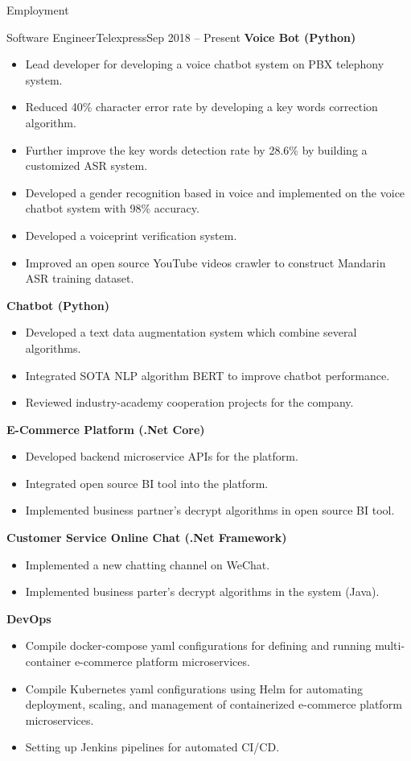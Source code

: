 \documentclass[]{mcdowellcv}
\begin{document}
	\makeheader
	
	\begin{cvsection}{Employment}
		\begin{cvsubsection}{Software Engineer}{Telexpress}{Sep 2018 -- Present}
			\textbf{Voice Bot (Python)}
			\begin{itemize}
				\item Lead developer for developing a voice chatbot system on PBX telephony system.
				\item Reduced 40\% character error rate by developing a key words correction algorithm.
				\item Further improve the key words detection rate by 28.6\% by building a customized ASR system.
				\item Developed a gender recognition based in voice and implemented on the voice chatbot system with 98\% accuracy.
				\item Developed a voiceprint verification system.
				\item Improved an open source YouTube videos crawler to construct Mandarin ASR training dataset.
			\end{itemize}
			\textbf{Chatbot (Python)}
			\begin{itemize}
				\item Developed a text data augmentation system which combine several algorithms.
				\item Integrated SOTA NLP algorithm BERT to improve chatbot performance.
				\item Reviewed industry-academy cooperation projects for the company.
			\end{itemize}
			\textbf{E-Commerce Platform (.Net Core)}
			\begin{itemize}
				\item Developed backend microservice APIs for the platform.
				\item Integrated open source BI tool into the platform.
				\item Implemented business partner's decrypt algorithms in open source BI tool.
			\end{itemize}
			\textbf{Customer Service Online Chat (.Net Framework)}
			\begin{itemize}
				\item Implemented a new chatting channel on WeChat.
				\item Implemented business parter's decrypt algorithms in the system (Java).
			\end{itemize}
			\textbf{DevOps}
			\begin{itemize}
				\item Compile docker-compose yaml configurations for defining and running multi-container e-commerce platform microservices.
				\item Compile Kubernetes yaml configurations using Helm for automating deployment, scaling, and management of containerized e-commerce platform microservices.
				\item Setting up Jenkins pipelines for automated CI/CD.
			\end{itemize}
		\end{cvsubsection}
	\end{cvsection}
	
\end{document}
